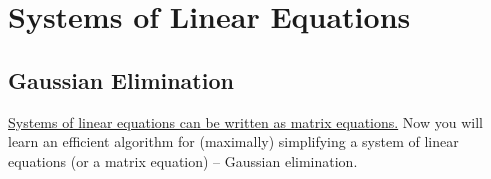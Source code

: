 \chapter{Systems of Linear Equations }
\label{systems}

\section{Gaussian Elimination}
\label{gaussElim}

\hyperlink{system2matrix}{Systems of linear equations can be written as matrix equations.}
Now you will learn  an efficient algorithm  for (maximally) simplifying a system of linear equations (or a matrix equation) -- Gaussian elimination.




